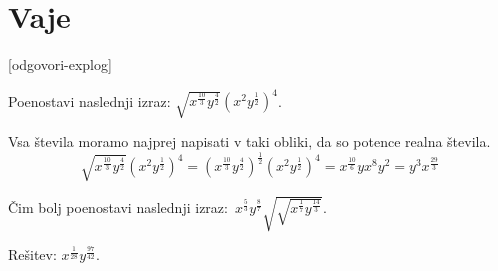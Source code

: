 \begin{figure}[h!]
\centering
{}
\end{figure}

\section{Vaje}
\label{sec:exp-log-vaje}


\def\datotekaOdgovori{odgovori-explog}

[\datotekaOdgovori]

%

\begin{vaja}
 Poenostavi naslednji izraz: \(\sqrt{x^{\frac{10}{3}}y^{\frac{4}{2}}}(x^{2}y^{\frac{1}{2}})^{4}\).

  \begin{odgovor}
   Vsa števila moramo najprej napisati v taki obliki, da so potence realna števila. 
	$$\sqrt{x^{\frac{10}{3}}y^{\frac{4}{2}}}(x^{2}y^{\frac{1}{2}})^{4}=(x^{\frac{10}{3}}y^{\frac{4}{2}})^{\frac{1}{2}}(x^{2}y^{\frac{1}{2}})^{4}=x^{\frac{10}{6}}yx^{8}y^{2}=y^{3}x^{\frac{29}{3}}$$
  \end{odgovor}
\end{vaja}

\begin{vaja}
  Čim bolj poenostavi naslednji izraz: \(\,x^{\frac{5}{3}}y^{\frac{8}{7}}\sqrt{\sqrt{x^{\frac{1}{7}}y^{\frac{14}{3}}}}\).

  \begin{odgovor}
   Rešitev: $x^{\frac{1}{28}} y^{\frac{97}{42}}$.
  \end{odgovor}
\end{vaja}

